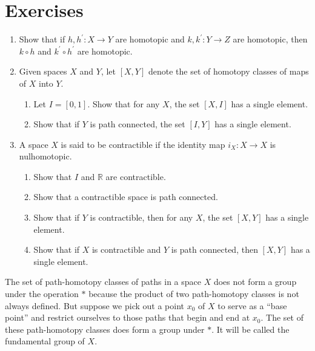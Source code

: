 \section*{Exercises}
\begin{enumerate}[itemsep=0.4em, parsep=0pt, topsep=0pt, partopsep=0pt, leftmargin=*, label=\arabic*., ref=\arabic*]
\item Show that if \(h,h^{\prime } : X \rightarrow Y\) are homotopic and \(k,k^{\prime } : Y \rightarrow Z\) are homotopic, then \(k \circ h\) and \(k^{\prime } \circ {h}^{\prime }\) are homotopic.
\item Given spaces \(X\) and \(Y\), let \([X,Y]\) denote the set of homotopy classes of maps of \(X\) into \(Y\).
 \begin{enumerate}[itemsep=0.2em, parsep=0pt, topsep=0pt, partopsep=0pt, leftmargin=*, label=(\alph*), align=left]
 \item Let \(I = [ {0,1}]\). Show that for any \(X\), the set \([ {X,I}]\) has a single element.
 \item Show that if \(Y\) is path connected, the set \([ {I,Y}]\) has a single element.
 \end{enumerate}
\item A space \(X\) is said to be contractible if the identity map \(i_{X} : X \rightarrow X\) is nulhomotopic.
 \begin{enumerate}[itemsep=0.2em, parsep=0pt, topsep=0pt, partopsep=0pt, leftmargin=*, label=(\alph*), align=left]
 \item Show that \(I\) and \(\mathbb{R}\) are contractible.
 \item Show that a contractible space is path connected.
 \item Show that if \(Y\) is contractible, then for any \(X\), the set \([ {X,Y}]\) has a single element.
 \item Show that if \(X\) is contractible and \(Y\) is path connected, then \([ {X,Y}]\) has a single element.
 \end{enumerate}
\end{enumerate}

The set of path-homotopy classes of paths in a space \(X\) does not form a group under the operation \(*\) because the product of two path-homotopy classes is not always defined. But suppose we pick out a point \(x_{0}\) of \(X\) to serve as a ``base point'' and restrict ourselves to those paths that begin and end at \(x_{0}\). The set of these path-homotopy classes does form a group under \(*\). It will be called the fundamental group of \(X\).

